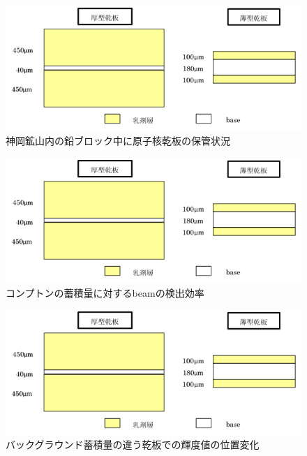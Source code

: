 \documentclass[12pt,a4paper]{jarticle}
\begin{document}
\begin{figure}[htbp]
  \centering
     \includegraphics[width=140mm]{emulsionorder.png}
  \caption{神岡鉱山内の鉛ブロック中に原子核乾板の保管状況\label{fig:emulsion_in_Kamioka}}
\end{figure}
\begin{figure}[htbp]
  \centering
     \includegraphics[width=140mm]{emulsionorder.png}
  \caption{コンプトンの蓄積量に対するbeamの検出効率\label{fig:beam_efficiency_to_compton}}
\end{figure}
\begin{figure}[htbp]
  \centering
     \includegraphics[width=140mm]{emulsionorder.png}
  \caption{バックグラウンド蓄積量の違う乾板での輝度値の位置変化\label{fig:britnese_in_some_emulsion}}
\end{figure}
\newpage
\end{document}
